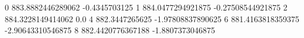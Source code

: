 0 883.8882446289062 -0.4345703125
1 884.0477294921875 -0.27508544921875
2 884.3228149414062 0.0
4 882.3447265625 -1.97808837890625
6 881.4163818359375 -2.90643310546875
8 882.4420776367188 -1.8807373046875
